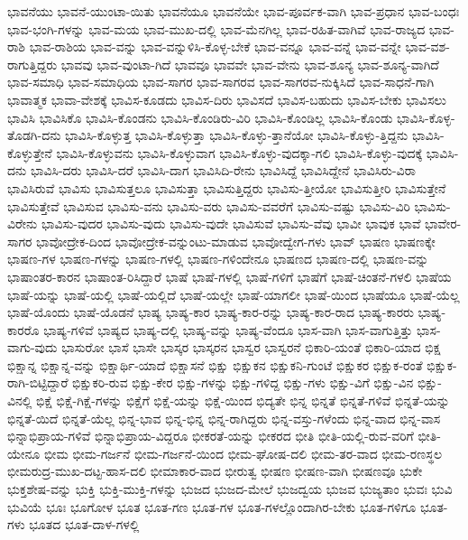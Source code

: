 {ಭಾವನೆಯು
ಭಾವನೆ-ಯುಂಟಾ-ಯಿತು
ಭಾವನೆಯೂ
ಭಾವನೆಯೇ
ಭಾವ-ಪೂರ್ವಕ-ವಾಗಿ
ಭಾವ-ಪ್ರಧಾನ
ಭಾವ-ಬಂಧಃ
ಭಾವ-ಭಂಗಿ-ಗಳನ್ನು
ಭಾವ-ಮಯ
ಭಾವ-ಮುಖ-ದಲ್ಲಿ
ಭಾವ-ಮೆನಗಿಲ್ಲ
ಭಾವ-ರಹಿತ-ವಾಗಿವೆ
ಭಾವ-ರಾಜ್ಯದ
ಭಾವ-ರಾಶಿ
ಭಾವ-ರಾಶಿಯ
ಭಾವ-ವನ್ನು
ಭಾವ-ವನ್ನುಳಿಸಿ-ಕೊಳ್ಳ-ಬೇಕೆ
ಭಾವ-ವನ್ನೂ
ಭಾವ-ವನ್ನೆ
ಭಾವ-ವನ್ನೇ
ಭಾವ-ವಶ-ರಾಗುತ್ತಿದ್ದರು
ಭಾವವು
ಭಾವ-ವುಂಟಾ-ಗಿದೆ
ಭಾವವೂ
ಭಾವವೇ
ಭಾವ-ವೇನು
ಭಾವ-ಶೂನ್ಯ
ಭಾವ-ಶೂನ್ಯ-ವಾಗಿದೆ
ಭಾವ-ಸಮಾಧಿ
ಭಾವ-ಸಮಾಧಿಯ
ಭಾವ-ಸಾಗರ
ಭಾವ-ಸಾಗರವ
ಭಾವ-ಸಾಗರವ-ನುಕ್ಕಿಸಿದೆ
ಭಾವ-ಸಾಧನೆ-ಗಾಗಿ
ಭಾವಾತ್ಮಕ
ಭಾವಾ-ವೇಶಕ್ಕೆ
ಭಾವಿಸ-ಕೂಡದು
ಭಾವಿಸ-ದಿರು
ಭಾವಿಸದೆ
ಭಾವಿಸ-ಬಹುದು
ಭಾವಿಸ-ಬೇಕು
ಭಾವಿಸಲು
ಭಾವಿಸಿ
ಭಾವಿಸಿಕೊ
ಭಾವಿಸಿ-ಕೊಂಡನು
ಭಾವಿಸಿ-ಕೊಂಡಿರು-ವಿರಿ
ಭಾವಿಸಿ-ಕೊಂಡಿಲ್ಲ
ಭಾವಿಸಿ-ಕೊಂಡು
ಭಾವಿಸಿ-ಕೊಳ್ಳ-ತೊಡಗಿ-ದನು
ಭಾವಿಸಿ-ಕೊಳ್ಳುತ್ತ
ಭಾವಿಸಿ-ಕೊಳ್ಳುತ್ತಾ
ಭಾವಿಸಿ-ಕೊಳ್ಳು-ತ್ತಾನೆಯೋ
ಭಾವಿಸಿ-ಕೊಳ್ಳು-ತ್ತಿದ್ದನು
ಭಾವಿಸಿ-ಕೊಳ್ಳುತ್ತೇನೆ
ಭಾವಿಸಿ-ಕೊಳ್ಳುವನು
ಭಾವಿಸಿ-ಕೊಳ್ಳುವಾಗ
ಭಾವಿಸಿ-ಕೊಳ್ಳು-ವುದಕ್ಕಾ-ಗಲಿ
ಭಾವಿಸಿ-ಕೊಳ್ಳು-ವುದಕ್ಕೆ
ಭಾವಿಸಿ-ದನು
ಭಾವಿಸಿ-ದರು
ಭಾವಿಸಿ-ದರೆ
ಭಾವಿಸಿ-ದಾಗ
ಭಾವಿಸಿದಿ-ರೇನು
ಭಾವಿಸಿದ್ದೆ
ಭಾವಿಸಿದ್ದೇನೆ
ಭಾವಿಸಿರು-ವಿರಾ
ಭಾವಿಸಿರುವೆ
ಭಾವಿಸು
ಭಾವಿಸುತ್ತಲೂ
ಭಾವಿಸುತ್ತಾ
ಭಾವಿಸುತ್ತಿದ್ದರು
ಭಾವಿಸು-ತ್ತೀಯೋ
ಭಾವಿಸುತ್ತೀರಿ
ಭಾವಿಸುತ್ತೇನೆ
ಭಾವಿಸುತ್ತೇವೆ
ಭಾವಿಸುವ
ಭಾವಿಸು-ವನು
ಭಾವಿಸು-ವರು
ಭಾವಿಸು-ವವರೆಗೆ
ಭಾವಿಸು-ವಷ್ಟು
ಭಾವಿಸು-ವಿರಿ
ಭಾವಿಸು-ವಿರೇನು
ಭಾವಿಸು-ವುದರ
ಭಾವಿಸು-ವುದು
ಭಾವಿಸು-ವುದೇ
ಭಾವಿಸುವೆ
ಭಾವಿಸು-ವೆವು
ಭಾವೀ
ಭಾವುಕ
ಭಾವೆ
ಭಾವೇರ-ಸಾಗರ
ಭಾವೋದ್ರೇಕ-ದಿಂದ
ಭಾವೋದ್ರೇಕ-ವನ್ನುಂಟು-ಮಾಡುವ
ಭಾವೋದ್ವೇಗ-ಗಳು
ಭಾವ್
ಭಾಷಣ
ಭಾಷಣಕ್ಕೇ
ಭಾಷಣ-ಗಳ
ಭಾಷಣ-ಗಳನ್ನು
ಭಾಷಣ-ಗಳಲ್ಲಿ
ಭಾಷಣ-ಗಳಿಂದೇನೂ
ಭಾಷಣದ
ಭಾಷಣ-ದಲ್ಲಿ
ಭಾಷಣ-ವನ್ನು
ಭಾಷಾಂತರ-ಕಾರನ
ಭಾಷಾಂತ-ರಿಸಿದ್ದಾರೆ
ಭಾಷೆ
ಭಾಷೆ-ಗಳಲ್ಲಿ
ಭಾಷೆ-ಗಳಿಗೆ
ಭಾಷೆಗೆ
ಭಾಷೆ-ಚಿಂತನೆ-ಗಳಲಿ
ಭಾಷೆಯ
ಭಾಷೆ-ಯನ್ನು
ಭಾಷೆ-ಯಲ್ಲಿ
ಭಾಷೆ-ಯಲ್ಲಿದೆ
ಭಾಷೆ-ಯಲ್ಲೇ
ಭಾಷೆ-ಯಾಗಲೀ
ಭಾಷೆ-ಯಿಂದ
ಭಾಷೆಯೂ
ಭಾಷೆ-ಯೆಲ್ಲ
ಭಾಷೆ-ಯೊಂದು
ಭಾಷೆ-ಯೊಡನೆ
ಭಾಷ್ಯ
ಭಾಷ್ಯ-ಕಾರ
ಭಾಷ್ಯ-ಕಾರ-ರನ್ನು
ಭಾಷ್ಯ-ಕಾರ-ರಾದ
ಭಾಷ್ಯ-ಕಾರರು
ಭಾಷ್ಯ-ಕಾರರೊ
ಭಾಷ್ಯ-ಗಳಿವೆ
ಭಾಷ್ಯದ
ಭಾಷ್ಯ-ದಲ್ಲಿ
ಭಾಷ್ಯ-ವನ್ನು
ಭಾಷ್ಯ-ವೆಂದೂ
ಭಾಸ-ವಾಗಿ
ಭಾಸ-ವಾಗುತ್ತಿತ್ತು
ಭಾಸ-ವಾಗು-ವುದು
ಭಾಸುರೋ
ಭಾಸೆ
ಭಾಸೇ
ಭಾಸ್ಕರ
ಭಾಸ್ಕರನ
ಭಾಸ್ವರ
ಭಾಸ್ವರನೆ
ಭಿಕಾರಿ-ಯಂತೆ
ಭಿಕಾರಿ-ಯಾದ
ಭಿಕ್ಷ
ಭಿಕ್ಷಾನ್ನ
ಭಿಕ್ಷಾನ್ನ-ವನ್ನು
ಭಿಕ್ಷಾರ್ಥಿ-ಯಾದೆ
ಭಿಕ್ಷಾಸನೆ
ಭಿಕ್ಷು
ಭಿಕ್ಷುಕನ
ಭಿಕ್ಷುಕನಿ-ಗುಂಟೆ
ಭಿಕ್ಷುಕರ
ಭಿಕ್ಷುಕ-ರಂತೆ
ಭಿಕ್ಷುಕ-ರಾಗಿ-ಬಿಟ್ಟಿದ್ದಾರೆ
ಭಿಕ್ಷುಕರಿ-ರುವ
ಭಿಕ್ಷು-ಕೇರ
ಭಿಕ್ಷು-ಗಳನ್ನು
ಭಿಕ್ಷು-ಗಳಿದ್ದ
ಭಿಕ್ಷು-ಗಳು
ಭಿಕ್ಷು-ವಿಗೆ
ಭಿಕ್ಷು-ವಿನ
ಭಿಕ್ಷು-ವಿನಲ್ಲಿ
ಭಿಕ್ಷೆ
ಭಿಕ್ಷೆ-ಗಿಕ್ಷೆ-ಗಳನ್ನು
ಭಿಕ್ಷೆಗೆ
ಭಿಕ್ಷೆ-ಯನ್ನು
ಭಿಕ್ಷೆ-ಯಿಂದ
ಭಿದ್ಯತೇ
ಭಿನ್ನ
ಭಿನ್ನತೆ
ಭಿನ್ನತೆ-ಗಳಿವೆ
ಭಿನ್ನತೆ-ಯನ್ನು
ಭಿನ್ನತೆ-ಯಿದೆ
ಭಿನ್ನತೆ-ಯೆಲ್ಲ
ಭಿನ್ನ-ಭಾವ
ಭಿನ್ನ-ಭಿನ್ನ
ಭಿನ್ನ-ರಾಗಿದ್ದರು
ಭಿನ್ನ-ವಸ್ತು-ಗಳೆಂದು
ಭಿನ್ನ-ವಾದ
ಭಿನ್ನ-ವಾಸ
ಭಿನ್ನಾಭಿಪ್ರಾಯ-ಗಳಿವೆ
ಭಿನ್ನಾಭಿಪ್ರಾಯ-ವಿದ್ದರೂ
ಭೀಕರತೆ-ಯನ್ನು
ಭೀಕರದ
ಭೀತಿ
ಭೀತಿ-ಯಲ್ಲಿ-ರುವ-ವರಿಗೆ
ಭೀತಿ-ಯೇನೂ
ಭೀಮ
ಭೀಮ-ಗರ್ಜನೆ
ಭೀಮ-ಗರ್ಜನೆ-ಯಿಂದ
ಭೀಮ-ಘೋಷ-ದಲಿ
ಭೀಮ-ತರ-ವಾದ
ಭೀಮ-ರಣಸ್ಥಲ
ಭೀಮರುದ್ರ-ಮುಖ-ದಟ್ಟ-ಹಾಸ-ದಲಿ
ಭೀಮಾಕಾರ-ವಾದ
ಭೀರುತ್ವ
ಭೀಷಣ
ಭೀಷಣ-ವಾಗಿ
ಭೀಷಣವೂ
ಭುಕೇ
ಭುಕ್ತಶೇಷ-ವನ್ನು
ಭುಕ್ತಿ
ಭುಕ್ತಿ-ಮುಕ್ತಿ-ಗಳನ್ನು
ಭುಜದ
ಭುಜದ-ಮೇಲೆ
ಭುಜದ್ವಯ
ಭುಜವ
ಭುಜ್ಯತಾಂ
ಭುವಃ
ಭುವಿ
ಭುವಿಯೆ
ಭೂಃ
ಭೂಗೋಳ
ಭೂತ
ಭೂತ-ಗಣ
ಭೂತ-ಗಳ
ಭೂತ-ಗಳಲ್ಲೊಂದಾಗಿರ-ಬೇಕು
ಭೂತ-ಗಳಿಗೂ
ಭೂತ-ಗಳು
ಭೂತದ
ಭೂತ-ದಾಳ-ಗಳಲ್ಲಿ
}
